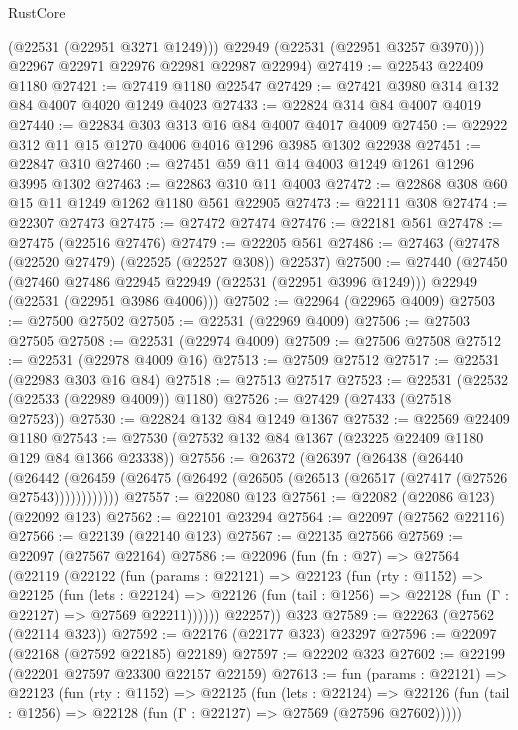 \begin{lexlean}{RustCore}
\begin{coremodule}
          (@22531 (@22951 @3271 @1249)))
        @22949
        (@22531 (@22951 @3257 @3970)))
      @22967
      @22971
      @22976
      @22981
      @22987
      @22994)
@27419 := @22543 @22409 @1180
@27421 := @27419 @1180 @22547
@27429 := @27421 @3980 @314 @132 @84 @4007 @4020 @1249 @4023
@27433 := @22824 @314 @84 @4007 @4019
@27440 := @22834 @303 @313 @16 @84 @4007 @4017 @4009
@27450 := @22922 @312 @11 @15 @1270 @4006 @4016 @1296 @3985 @1302 @22938
@27451 := @22847 @310
@27460 := @27451 @59 @11 @14 @4003 @1249 @1261 @1296 @3995 @1302
@27463 := @22863 @310 @11 @4003
@27472 := @22868 @308 @60 @15 @11 @1249 @1262 @1180 @561 @22905
@27473 := @22111 @308
@27474 := @22307 @27473
@27475 := @27472 @27474
@27476 := @22181 @561
@27478 := @27475 (@22516 @27476)
@27479 := @22205 @561
@27486 := @27463 (@27478 (@22520 @27479) (@22525 (@22527 @308)) @22537)
@27500 := @27440
    (@27450
      (@27460 @27486 @22945 @22949 (@22531 (@22951 @3996 @1249)))
      @22949
      (@22531 (@22951 @3986 @4006)))
@27502 := @22964 (@22965 @4009)
@27503 := @27500 @27502
@27505 := @22531 (@22969 @4009)
@27506 := @27503 @27505
@27508 := @22531 (@22974 @4009)
@27509 := @27506 @27508
@27512 := @22531 (@22978 @4009 @16)
@27513 := @27509 @27512
@27517 := @22531 (@22983 @303 @16 @84)
@27518 := @27513 @27517
@27523 := @22531 (@22532 (@22533 (@22989 @4009)) @1180)
@27526 := @27429 (@27433 (@27518 @27523))
@27530 := @22824 @132 @84 @1249 @1367
@27532 := @22569 @22409 @1180
@27543 := @27530 (@27532 @132 @84 @1367 (@23225 @22409 @1180 @129 @84 @1366 @23338))
@27556 := @26372
    (@26397
      (@26438
        (@26440
          (@26442 (@26459 (@26475 (@26492 (@26505 (@26513 (@26517 (@27417 (@27526 @27543))))))))))))
@27557 := @22080 @123
@27561 := @22082 (@22086 @123) (@22092 @123)
@27562 := @22101 @23294
@27564 := @22097 (@27562 @22116)
@27566 := @22139 (@22140 @123)
@27567 := @22135 @27566
@27569 := @22097 (@27567 @22164)
@27586 := @22096
    (fun (fn : @27) =>
    @27564
      (@22119
        (@22122
          (fun (params : @22121) =>
          @22123
            (fun (rty : @1152) =>
            @22125
              (fun (lets : @22124) =>
              @22126 (fun (tail : @1256) => @22128 (fun (Γ : @22127) => @27569 @22211))))))
        @22257))
    @323
@27589 := @22263 (@27562 (@22114 @323))
@27592 := @22176 (@22177 @323) @23297
@27596 := @22097 (@22168 (@27592 @22185) @22189)
@27597 := @22202 @323
@27602 := @22199 (@22201 @27597 @23300 @22157 @22159)
@27613 := fun (params : @22121) =>
  @22123
    (fun (rty : @1152) =>
    @22125
      (fun (lets : @22124) =>
      @22126 (fun (tail : @1256) => @22128 (fun (Γ : @22127) => @27569 (@27596 @27602)))))

\end{coremodule}
\end{lexlean}
